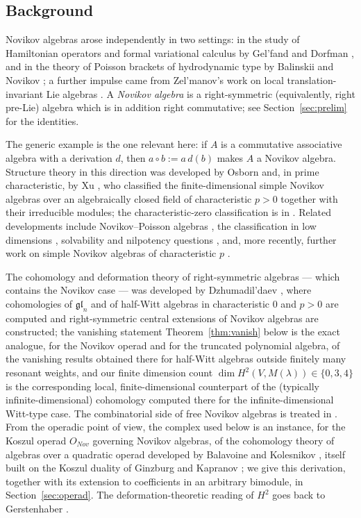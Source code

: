 \documentclass[11pt,reqno]{amsart}
\theoremstyle{plain}
\theoremstyle{definition}
\newcommand{\Ht}{H^2}
\begin{document}
\subsection{Background}
Novikov algebras arose independently in two settings: in the study of Hamiltonian operators
and formal variational calculus by Gel'fand and Dorfman \cite{GelfandDorfman}, and in the
theory of Poisson brackets of hydrodynamic type by Balinskii and Novikov
\cite{BalinskiiNovikov}; a further impulse came from Zel'manov's work on local
translation-invariant Lie algebras \cite{Zelmanov}. A \emph{Novikov algebra} is a
right-symmetric (equivalently, right pre-Lie) algebra which is in addition right
commutative; see Section~\ref{sec:prelim} for the identities.

The generic example is the one relevant here: if $A$ is a commutative associative algebra
with a derivation $d$, then $a\circ b:=a\,d(b)$ makes $A$ a Novikov algebra. Structure
theory in this direction was developed by Osborn \cite{Osborn1992a,Osborn1992b,Osborn1994}
and, in prime characteristic, by Xu \cite{Xu1996}, who classified the finite-dimensional
simple Novikov algebras over an algebraically closed field of characteristic $p>0$ together
with their irreducible modules; the characteristic-zero classification is in \cite{Xu2001}.
Related developments include Novikov--Poisson algebras \cite{XuNP}, the classification in
low dimensions \cite{BaiMeng}, solvability and nilpotency questions
\cite{ShestakovZhang}, and, more recently, further work on simple Novikov algebras of
characteristic $p$ \cite{ZhelyabinZakharov}.

The cohomology and deformation theory of right-symmetric algebras --- which contains the
Novikov case --- was developed by Dzhumadil'daev \cite{Dzhu1999}, where cohomologies of
$\mathfrak{gl}_n$ and of half-Witt algebras in characteristic $0$ and $p>0$ are computed and
right-symmetric central extensions of Novikov algebras are constructed; the vanishing
statement Theorem~\ref{thm:vanish} below is the exact analogue, for the Novikov operad and
for the truncated polynomial algebra, of the vanishing results obtained there for half-Witt
algebras outside finitely many resonant weights, and our finite dimension count
$\dim\Ht(V,M(\lambda))\in\{0,3,4\}$ is the corresponding local, finite-dimensional
counterpart of the (typically infinite-dimensional) cohomology computed there for the
infinite-dimensional Witt-type case. The combinatorial side of free Novikov algebras is
treated in \cite{DzhuLofwall}. From the operadic point of view, the complex used below is an
instance, for the Koszul operad $O_{Nov}$ governing Novikov algebras, of the cohomology
theory of algebras over a quadratic operad developed by Balavoine and Kolesnikov
\cite{Balavoine1997,Balavoine1998, kol}, itself built on the Koszul duality of Ginzburg and
Kapranov \cite{GinzburgKapranov}; we give this derivation, together with its extension to
coefficients in an arbitrary bimodule, in Section~\ref{sec:operad}. The deformation-theoretic
reading of $\Ht$ goes back to Gerstenhaber \cite{Gerstenhaber}.
\end{document}
